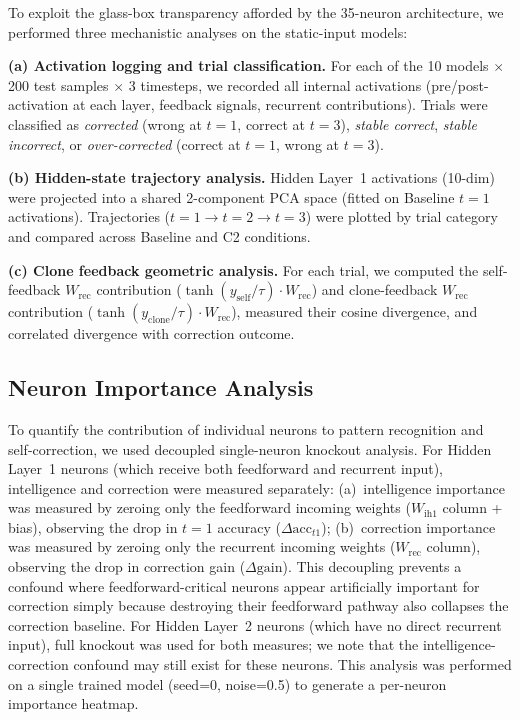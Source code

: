 \documentclass[10pt]{article}
\begin{document}
To exploit the glass-box transparency afforded by the 35-neuron architecture, we performed three mechanistic analyses on the static-input models:

\textbf{(a) Activation logging and trial classification.} For each of the 10 models $\times$ 200 test samples $\times$ 3 timesteps, we recorded all internal activations (pre/post-activation at each layer, feedback signals, recurrent contributions). Trials were classified as \emph{corrected} (wrong at $t{=}1$, correct at $t{=}3$), \emph{stable correct}, \emph{stable incorrect}, or \emph{over-corrected} (correct at $t{=}1$, wrong at $t{=}3$).

\textbf{(b) Hidden-state trajectory analysis.} Hidden Layer~1 activations (10-dim) were projected into a shared 2-component PCA space (fitted on Baseline $t{=}1$ activations). Trajectories ($t{=}1 \to t{=}2 \to t{=}3$) were plotted by trial category and compared across Baseline and C2 conditions.

\textbf{(c) Clone feedback geometric analysis.} For each trial, we computed the self-feedback $W_\text{rec}$ contribution ($\tanh(y_\text{self}/\tau) \cdot W_\text{rec}$) and clone-feedback $W_\text{rec}$ contribution ($\tanh(y_\text{clone}/\tau) \cdot W_\text{rec}$), measured their cosine divergence, and correlated divergence with correction outcome.

\subsection{Neuron Importance Analysis}

To quantify the contribution of individual neurons to pattern recognition and self-correction, we used decoupled single-neuron knockout analysis. For Hidden Layer~1 neurons (which receive both feedforward and recurrent input), intelligence and correction were measured separately: (a)~intelligence importance was measured by zeroing only the feedforward incoming weights ($W_\text{ih1}$ column + bias), observing the drop in $t{=}1$ accuracy ($\Delta\text{acc}_{t1}$); (b)~correction importance was measured by zeroing only the recurrent incoming weights ($W_\text{rec}$ column), observing the drop in correction gain ($\Delta\text{gain}$). This decoupling prevents a confound where feedforward-critical neurons appear artificially important for correction simply because destroying their feedforward pathway also collapses the correction baseline. For Hidden Layer~2 neurons (which have no direct recurrent input), full knockout was used for both measures; we note that the intelligence-correction confound may still exist for these neurons. This analysis was performed on a single trained model (seed=0, noise=0.5) to generate a per-neuron importance heatmap.
\end{document}
